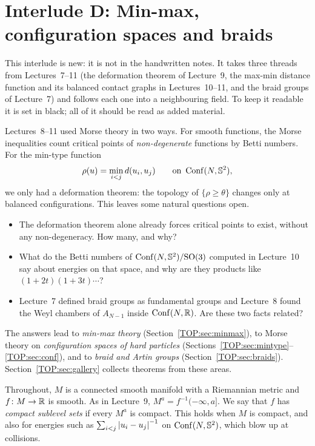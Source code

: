 
\chapter[Interlude D: Min-max and braids]{Interlude D: Min-max, configuration spaces and braids}
\label{TOP:ch}

\begin{addedblock}
This interlude is new: it is not in the handwritten notes. It takes three threads from
Lectures~7--11 (the deformation theorem of Lecture~9, the max-min distance function and its balanced
contact graphs in Lectures~10--11, and the braid groups of Lecture~7) and follows each one into a
neighbouring field. To keep it readable it is set in black; all of it should be read as added material.
\end{addedblock}

Lectures~8--11 used Morse theory in two ways. For smooth functions, the Morse inequalities count critical
points of \emph{non-degenerate} functions by Betti numbers. For the min-type function
\[
  \rho(u)=\min_{i<j}d(u_i,u_j)\qquad\text{on }\operatorname{Conf}(N,\mathbb{S}^2),
\]
we only had a deformation theorem: the topology of $\{\rho\ge\theta\}$ changes only at balanced
configurations. This leaves some natural questions open.
\begin{itemize}
\item The deformation theorem alone already forces critical points to exist, without any
  non-degeneracy. How many, and why?
\item What do the Betti numbers of $\operatorname{Conf}(N,\mathbb{S}^2)/\mathrm{SO}(3)$ computed in Lecture~10 say about energies on
  that space, and why are they products like $(1+2t)(1+3t)\cdots$?
\item Lecture~7 defined braid groups as fundamental groups and Lecture~8 found the Weyl chambers of
  $A_{N-1}$ inside $\operatorname{Conf}(N,\mathbb{R})$. Are these two facts related?
\end{itemize}
The answers lead to \emph{min-max theory} (Section~\ref{TOP:sec:minmax}), to Morse theory on
\emph{configuration spaces of hard particles} (Sections~\ref{TOP:sec:mintype}--\ref{TOP:sec:conf}),
and to \emph{braid and Artin groups} (Section~\ref{TOP:sec:braids}). Section~\ref{TOP:sec:gallery}
collects theorems from these areas.

Throughout, $M$ is a connected smooth manifold with a Riemannian metric and $f\colon M\to\mathbb{R}$ is
smooth. As in Lecture~9, $M^a=f^{-1}(-\infty,a]$. We say that $f$ has \emph{compact sublevel sets} if
every $M^a$ is compact. This holds when $M$ is compact, and also for energies such as
$\sum_{i<j}\left\lvert u_i-u_j \right\rvert^{-1}$ on $\operatorname{Conf}(N,\mathbb{S}^2)$, which blow up at collisions.

